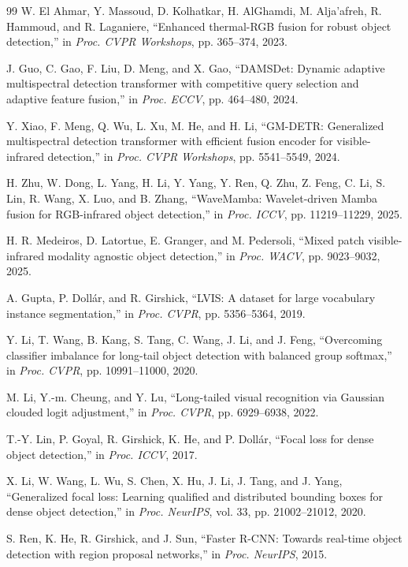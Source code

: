 \documentclass[letterpaper,journal]{IEEEtran}
\begin{document}
\begin{thebibliography}{99}
W. El Ahmar, Y. Massoud, D. Kolhatkar, H. AlGhamdi, M. Alja'afreh, R. Hammoud, and R. Laganiere, ``Enhanced thermal-RGB fusion for robust object detection,'' in \emph{Proc. CVPR Workshops}, pp. 365--374, 2023.


J. Guo, C. Gao, F. Liu, D. Meng, and X. Gao, ``DAMSDet: Dynamic adaptive multispectral detection transformer with competitive query selection and adaptive feature fusion,'' in \emph{Proc. ECCV}, pp. 464--480, 2024.


Y. Xiao, F. Meng, Q. Wu, L. Xu, M. He, and H. Li, ``GM-DETR: Generalized multispectral detection transformer with efficient fusion encoder for visible-infrared detection,'' in \emph{Proc. CVPR Workshops}, pp. 5541--5549, 2024.

H. Zhu, W. Dong, L. Yang, H. Li, Y. Yang, Y. Ren, Q. Zhu, Z. Feng, C. Li, S. Lin, R. Wang, X. Luo, and B. Zhang, ``WaveMamba: Wavelet-driven Mamba fusion for RGB-infrared object detection,'' in \emph{Proc. ICCV}, pp. 11219--11229, 2025.

H. R. Medeiros, D. Latortue, E. Granger, and M. Pedersoli, ``Mixed patch visible-infrared modality agnostic object detection,'' in \emph{Proc. WACV}, pp. 9023--9032, 2025.


A. Gupta, P. Doll\'ar, and R. Girshick, ``LVIS: A dataset for large vocabulary instance segmentation,'' in \emph{Proc. CVPR}, pp. 5356--5364, 2019.


Y. Li, T. Wang, B. Kang, S. Tang, C. Wang, J. Li, and J. Feng, ``Overcoming classifier imbalance for long-tail object detection with balanced group softmax,'' in \emph{Proc. CVPR}, pp. 10991--11000, 2020.


M. Li, Y.-m. Cheung, and Y. Lu, ``Long-tailed visual recognition via Gaussian clouded logit adjustment,'' in \emph{Proc. CVPR}, pp. 6929--6938, 2022.


T.-Y. Lin, P. Goyal, R. Girshick, K. He, and P. Doll\'ar, ``Focal loss for dense object detection,'' in \emph{Proc. ICCV}, 2017.


X. Li, W. Wang, L. Wu, S. Chen, X. Hu, J. Li, J. Tang, and J. Yang, ``Generalized focal loss: Learning qualified and distributed bounding boxes for dense object detection,'' in \emph{Proc. NeurIPS}, vol. 33, pp. 21002--21012, 2020.


S. Ren, K. He, R. Girshick, and J. Sun, ``Faster R-CNN: Towards real-time object detection with region proposal networks,'' in \emph{Proc. NeurIPS}, 2015.



\end{thebibliography}
\end{document}
